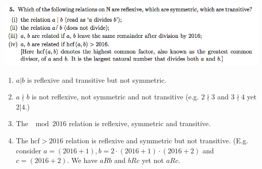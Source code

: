 \documentclass[12pt]{article}
\begin{document}
\subsection*{} %
\includegraphics[width=400pt]{img/iulm-1-5.png}
\begin{mdframed}
  \begin{enumerate}[label=(\roman*)]
  \item $a | b$ is reflexive and transitive but not symmetric.
  \item $a \nmid b$ is not reflexive, not symmetric and not transitive (e.g.
    $2 \nmid 3$ and $3 \nmid 4$ yet $2 | 4$.)
  \item The $\mod 2016$ relation is reflexive, symmetric and transitive.
  \item The $\text{hcf} > 2016$ relation is reflexive and symmetric but not
    transitive. (E.g. consider $a = (2016+1), b = 2\cdot(2016+1)\cdot(2016+2)$
    and $c = (2016+2)$. We have $a R b$ and $b R c$ yet not $a R c$.
  \end{enumerate}
\end{mdframed}

\newpage
\end{document}
